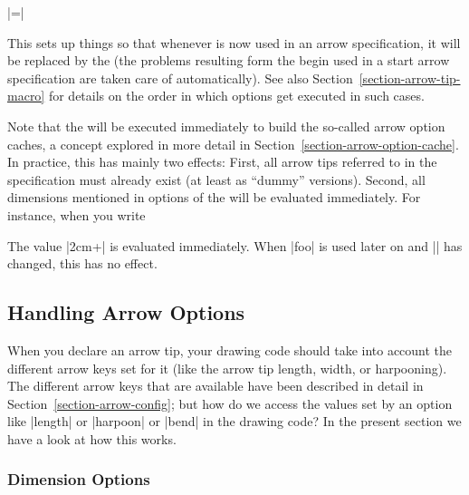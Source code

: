 \begin{command}{\pgfdeclarearrow{}}
\begin{itemize}
    \smallskip
    |=|
    
    This sets up things so that whenever  is now used in an
    arrow specification, it will be replaced by the  (the problems resulting form the 
    begin used in a start arrow  specification are taken care of
    automatically). See also Section~\ref{section-arrow-tip-macro} for
    details on the order in which options get executed in such cases.

    Note that the  will be executed
    immediately to build the so-called arrow option caches, a concept
    explored in more detail in
    Section~\ref{section-arrow-option-cache}. In practice, this has
    mainly two effects: First, all arrow tips referred to in the
    specification must already exist (at least as ``dummy''
    versions). Second, all dimensions mentioned in options of the
     will be evaluated immediately. For
    instance, when you write
\begin{codeexample}
\end{codeexample}
    The value |2cm+\mydimen| is evaluated immediately. When |foo| is
    used later on and |\mydimen| has changed, this has no effect. 
  \end{itemize}
\end{command}



\subsection{Handling Arrow Options}

\label{section-arrow-options}

When you declare an arrow tip, your drawing code should take into
account the different arrow keys set for it (like the arrow tip length, 
width, or harpooning). The different arrow keys that are available
have been described in detail in Section~\ref{section-arrow-config}; but
how do we access the values set by an option like |length| or
|harpoon| or |bend| in the drawing code? In the present section we
have a look at how this works.


\subsubsection{Dimension Options}

